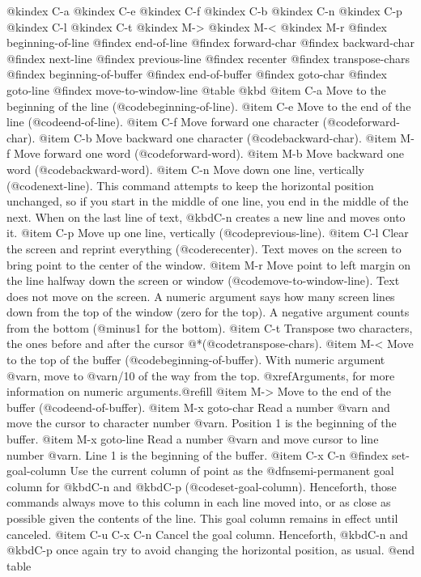 {{@kindex C-a
@kindex C-e
@kindex C-f
@kindex C-b
@kindex C-n
@kindex C-p
@kindex C-l
@kindex C-t
@kindex M->
@kindex M-<
@kindex M-r
@findex beginning-of-line
@findex end-of-line
@findex forward-char
@findex backward-char
@findex next-line
@findex previous-line
@findex recenter
@findex transpose-chars
@findex beginning-of-buffer
@findex end-of-buffer
@findex goto-char
@findex goto-line
@findex move-to-window-line
@table @kbd
@item C-a
Move to the beginning of the line (@code{beginning-of-line}).
@item C-e
Move to the end of the line (@code{end-of-line}).
@item C-f
Move forward one character (@code{forward-char}).
@item C-b
Move backward one character (@code{backward-char}).
@item M-f
Move forward one word (@code{forward-word}).
@item M-b
Move backward one word (@code{backward-word}).
@item C-n
Move down one line, vertically (@code{next-line}).  This command attempts to keep the horizontal position unchanged, so if you start in the middle of one line, you end in the middle of the next.  When on the last line of text, @kbd{C-n} creates a new line and moves onto it.  @item C-p
Move up one line, vertically (@code{previous-line}).
@item C-l
Clear the screen and reprint everything (@code{recenter}).  Text moves
on the screen to bring point to the center of the window.
@item M-r
Move point to left margin on the line halfway down the screen or
window (@code{move-to-window-line}).  Text does not move on the
screen.  A numeric argument says how many screen lines down from the
top of the window (zero for the top).  A negative argument counts from
the bottom (@minus{}1 for the bottom).
@item C-t
Transpose two characters, the ones before and after the cursor
@*(@code{transpose-chars}).
@item M-<
Move to the top of the buffer (@code{beginning-of-buffer}).  With
numeric argument @var{n}, move to @var{n}/10 of the way from the top.
@xref{Arguments}, for more information on numeric arguments.@refill
@item M->
Move to the end of the buffer (@code{end-of-buffer}).
@item M-x goto-char
Read a number @var{n} and move the cursor to character number @var{n}.
Position 1 is the beginning of the buffer.
@item M-x goto-line
Read a number @var{n} and move cursor to line number @var{n}.  Line 1
is the beginning of the buffer.
@item C-x C-n
@findex set-goal-column
Use the current column of point as the @dfn{semi-permanent goal column} for
@kbd{C-n} and @kbd{C-p} (@code{set-goal-column}).  Henceforth, those
commands always move to this column in each line moved into, or as
close as possible given the contents of the line.  This goal column remains
in effect until canceled.
@item C-u C-x C-n
Cancel the goal column.  Henceforth, @kbd{C-n} and @kbd{C-p} once
again try to avoid changing the horizontal position, as usual.
@end table

}}
